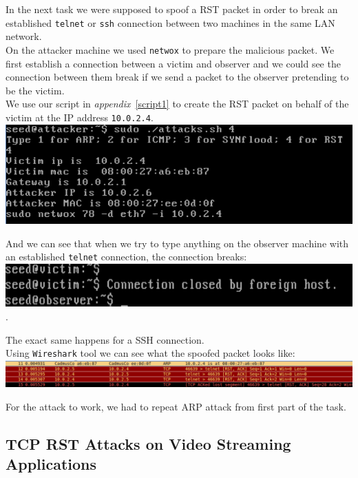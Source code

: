 \documentclass[12pt, a4paper]{article}
\begin{document}
In the next task we were supposed to spoof a RST packet in order to break an established \texttt{telnet} or \texttt{ssh} connection between two machines in the same LAN network.\\

On the attacker machine we used \texttt{netwox} to prepare the malicious packet. We first establish a connection between a victim and observer and we could see the connection between them break if we send a packet to the observer pretending to be the victim.\\

We use our script in \emph{appendix}~\ref{script1} to create the RST packet on behalf of the victim at the IP address \texttt{10.0.2.4}.\\

\includegraphics[width=.95\textwidth]{gfx/rst-attack.png}

And we can see that when we try to type anything on the observer machine with an established \texttt{telnet} connection, the connection breaks:\\

\includegraphics[width=.95\textwidth]{gfx/rst-reset.png}.

The exact same happens for a SSH connection.\\

Using \texttt{Wireshark} tool we can see what the spoofed packet looks like:\\

\includegraphics[width=.95\textwidth]{gfx/rst-spoofed.png}

For the attack to work, we had to repeat ARP attack from first part of the task.

\subsection{TCP RST Attacks on Video Streaming Applications}
\end{document}
